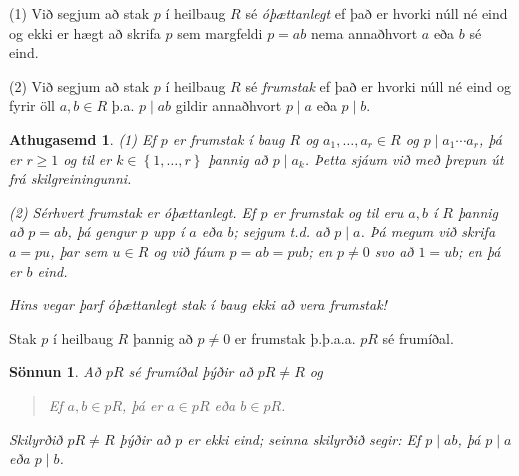 \documentclass[a4paper,icelandic,11pt]{book}
\theoremstyle{plain}
\newtheorem*{ath}{Athugasemd}
\newtheorem*{sonnun}{Sönnun}
\begin{document}
\begin{skilgr}
  (1) Við segjum að stak $p$ í heilbaug $R$ sé
  \emph{óþættanlegt} ef það er hvorki núll né eind og ekki er
  hægt að skrifa $p$ sem margfeldi $p=ab$ nema annaðhvort $a$ eða $b$ sé eind.

  (2) Við segjum að stak $p$ í heilbaug $R$ sé \emph{frumstak}
  ef það er hvorki núll né eind og fyrir öll $a,b\in R$ þ.a. $p\mid ab$ gildir
  annaðhvort $p\mid a$ eða $p\mid b$.
\end{skilgr}
\begin{ath}
  (1) Ef $p$ er frumstak í baug $R$ og $a_1,\dots,a_r\in R$ og
  $p\mid a_1\cdots a_r$, þá er $r\geq 1$ og til er $k\in\left\{ 1,\dots,r \right\}$
  þannig að $p\mid a_k$. Þetta sjáum við með þrepun út frá skilgreiningunni.

  (2) Sérhvert frumstak er óþættanlegt. Ef $p$ er frumstak og til eru $a,b$ í
  $R$ þannig að $p=ab$, þá gengur $p$ upp í $a$ eða $b$; sejgum t.d. að $p\mid a$.
  Þá megum við skrifa $a = pu$, þar sem $u\in R$ og við fáum $p=ab=pub$; en
  $p\neq 0$ svo að $1=ub$; en þá er $b$ eind.

  Hins vegar þarf óþættanlegt stak í baug ekki að vera frumstak!
\end{ath}
\begin{setn}
  Stak $p$ í heilbaug $R$ þannig að $p\neq 0$ er frumstak þ.þ.a.a. $pR$ sé
  frumíðal.
\end{setn}
\begin{sonnun}
  Að $pR$ sé frumíðal þýðir að $pR\neq R$ og
  \begin{quote}
    Ef $a,b\in pR$, þá er $a\in pR$ eða $b\in pR$.
  \end{quote}
  Skilyrðið $pR\neq R$ þýðir að $p$ er ekki eind; seinna skilyrðið segir: Ef
  $p\mid ab$, þá $p\mid a$ eða $p\mid b$.
\end{sonnun}
\end{document}
